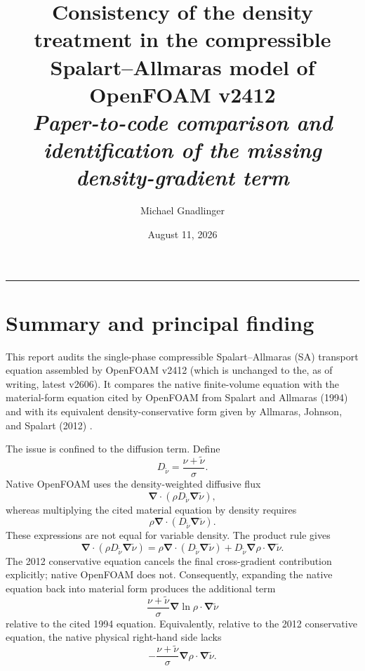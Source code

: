 \documentclass[11pt]{article}
\title{\vspace{-3em}\textcolor{SAHypBlue}{Consistency of the density treatment in the compressible Spalart--Allmaras model of OpenFOAM v2412}\\[1.2em]
\large\textit{Paper-to-code comparison and identification of the missing density-gradient term}\vspace{-1em}}
\author{Michael Gnadlinger}
\date{August 11, 2026}
\newcommand{\SAgrad}{\boldsymbol{\nabla}}
\newcommand{\SAdiv}{\boldsymbol{\nabla}\!\cdot}
\newcommand{\SAOF}{OpenFOAM}
\begin{document}
\maketitle
\vspace{-1em}
\hrule
\vspace{-1em}

\section{Summary and principal finding}
\label{sec:sa-summary}

This report audits the single-phase compressible Spalart--Allmaras (SA)
transport equation assembled by \SAOF{} v2412 (which is unchanged to the, as of writing, latest v2606).  It compares the native
finite-volume equation with the material-form equation cited by \SAOF{} from
Spalart and Allmaras (1994) and with its equivalent density-conservative form
given by Allmaras, Johnson, and Spalart (2012)
\cite{SpalartAllmaras1994,AJS2012}.

The issue is confined to the diffusion term.  Define
\[
  D_{\widetilde{\nu}}=\frac{\nu+\widetilde{\nu}}{\sigma}.
\]
Native \SAOF{} uses the density-weighted diffusive flux
\[
  \SAdiv\!\left(
    \rho D_{\widetilde{\nu}}\SAgrad\widetilde{\nu}
  \right),
\]
whereas multiplying the cited material equation by density requires
\[
  \rho\SAdiv\!\left(
    D_{\widetilde{\nu}}\SAgrad\widetilde{\nu}
  \right).
\]
These expressions are not equal for variable density.  The product rule gives
\[
  \SAdiv\!\left(
    \rho D_{\widetilde{\nu}}\SAgrad\widetilde{\nu}
  \right)
  =
  \rho\SAdiv\!\left(
    D_{\widetilde{\nu}}\SAgrad\widetilde{\nu}
  \right)
  +D_{\widetilde{\nu}}
   \SAgrad\rho\mathbin{\cdot}\SAgrad\widetilde{\nu}.
\]
The 2012 conservative equation cancels the final cross-gradient contribution
explicitly; native \SAOF{} does not.  Consequently, expanding the native
equation back into material form produces the additional term
\begin{equation}
  \boxed{
  \frac{\nu+\widetilde{\nu}}{\sigma}
  \SAgrad\ln\rho\mathbin{\cdot}\SAgrad\widetilde{\nu}}
  \label{eq:sa-summary-extra-term}
\end{equation}
relative to the cited 1994 equation.  Equivalently, relative to the 2012
conservative equation, the native physical right-hand side lacks
\begin{equation}
  \boxed{
  -\frac{\nu+\widetilde{\nu}}{\sigma}
  \SAgrad\rho\mathbin{\cdot}\SAgrad\widetilde{\nu}}.
  \label{eq:sa-summary-missing-term}
\end{equation}
\end{document}
